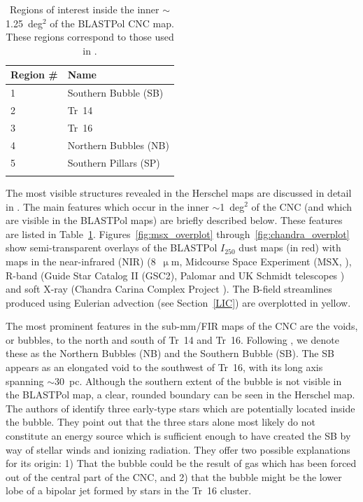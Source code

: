 \begin{table}[!htbp]
\centering
\begin{tabular}{@{}ll@{}}
\dtoprule{}
Region \# & Name \\ \midrule
1 & Southern Bubble (SB) \\
2 & Tr~14 \\
3 & Tr~16 \\
4 & Northern Bubbles (NB) \\
5 & Southern Pillars (SP) \\ \dbottomrule{}
\\
\end{tabular}
\caption[~Regions of interest inside the inner  of the BLASTPol CNC map.]{Regions of interest inside the inner $\sim$1.25~deg$^{2}$ of the BLASTPol CNC map. These regions correspond to those used in \citet{preibisch2012herschel}.}
\label{table:regions}
\end{table}

The most visible structures revealed in the Herschel maps are discussed in detail in \citet{preibisch2012herschel}. The main features which occur in the inner $\sim$1~deg$^{2}$ of the CNC (and which are visible in the BLASTPol maps) are briefly described below. These features are listed in Table~\ref{table:regions}. Figures~\ref{fig:msx_overplot} through~\ref{fig:chandra_overplot} show semi-transparent overlays of the BLASTPol $I_{250}$ dust maps (in red) with maps in the near-infrared (NIR) (8~$\upmu$m, Midcourse Space Experiment (MSX, \citet{smith2000large}), R-band (Guide Star Catalog II (GSC2), Palomar and UK Schmidt telescopes \citep{lasker2008second}) and soft X-ray (Chandra Carina Complex Project \citep{townsley2011introduction}). The B-field streamlines produced using Eulerian advection (see Section~\ref{LIC}) are overplotted in yellow.

The most prominent features in the sub-mm/FIR maps of the CNC are the voids, or bubbles, to the north and south of Tr~14 and Tr~16. Following \citet{preibisch2012herschel}, we denote these as the Northern Bubbles (NB) and the Southern Bubble (SB). The SB appears as an elongated void to the southwest of Tr~16, with its long axis spanning $\sim$30~pc. Although the southern extent of the bubble is not visible in the BLASTPol map, a clear, rounded boundary can be seen in the Herschel map. The authors of \citet{preibisch2012herschel} identify three early-type stars which are potentially located inside the bubble. They point out that the three stars alone most likely do not constitute an energy source which is sufficient enough to have created the SB by way of stellar winds and ionizing radiation. They offer two possible explanations for its origin: 1) That the bubble could be the result of gas which has been forced out of the central part of the CNC, and 2) that the bubble might be the lower lobe of a bipolar jet formed by stars in the Tr~16 cluster.

